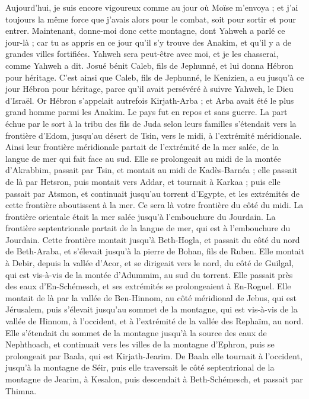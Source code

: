 \begin{multicols}{2}
Aujourd’hui, je suis encore vigoureux comme au jour où Moïse m’envoya ; et j’ai toujours la même force que j’avais alors pour le combat, soit pour sortir et pour entrer.
Maintenant, donne-moi donc cette montagne, dont Yahweh a parlé ce jour-là ; car tu as appris en ce jour qu’il s’y trouve des Anakim, et qu’il y a de grandes villes fortifiées. Yahweh sera peut-être avec moi, et je les chasserai, comme Yahweh a dit.
Josué bénit Caleb, fils de Jephunné, et lui donna Hébron pour héritage.
C’est ainsi que Caleb, fils de Jephunné, le Kenizien, a eu jusqu’à ce jour Hébron pour héritage, parce qu’il avait persévéré à suivre Yahweh, le Dieu d’Israël.
Or Hébron s’appelait autrefois Kirjath-Arba ; et Arba avait été le plus grand homme parmi les Anakim. Le pays fut en repos et sans guerre.
\VerseOne{}La part échue par le sort à la tribu des fils de Juda selon leurs familles s’étendait vers la frontière d’Edom, jusqu’au désert de Tsin, vers le midi, à l’extrémité méridionale.
Ainsi leur frontière méridionale partait de l’extrémité de la mer salée, de la langue de mer qui fait face au sud.
Elle se prolongeait au midi de la montée d’Akrabbim, passait par Tsin, et montait au midi de Kadès-Barnéa ; elle passait de là par Hetsron, puis montait vers Addar, et tournait à Karkaa ;
puis elle passait par Atsmon, et continuait jusqu’au torrent d’Egypte, et les extrémités de cette frontière aboutissent à la mer. Ce sera là votre frontière du côté du midi.
La frontière orientale était la mer salée jusqu’à l’embouchure du Jourdain. La frontière septentrionale partait de la langue de mer, qui est à l’embouchure du Jourdain.
Cette frontière montait jusqu’à Beth-Hogla, et passait du côté du nord de Beth-Araba, et s’élevait jusqu’à la pierre de Bohan, fils de Ruben.
Elle montait à Debir, depuis la vallée d’Acor, et se dirigeait vers le nord, du côté de Guilgal, qui est vis-à-vis de la montée d’Adummim, au sud du torrent. Elle passait près des eaux d’En-Schémesch, et ses extrémités se prolongeaient à En-Roguel.
Elle montait de là par la vallée de Ben-Hinnom, au côté méridional de Jebus, qui est Jérusalem, puis s’élevait jusqu’au sommet de la montagne, qui est vis-à-vis de la vallée de Hinnom, à l’occident, et à l’extrémité de la vallée des Rephaïm, au nord.
Elle s’étendait du sommet de la montagne jusqu’à la source des eaux de Nephthoach, et continuait vers les villes de la montagne d’Ephron, puis se prolongeait par Baala, qui est Kirjath-Jearim.
De Baala elle tournait à l’occident, jusqu’à la montagne de Séir, puis elle traversait le côté septentrional de la montagne de Jearim, à Kesalon, puis descendait à Beth-Schémesch, et passait par Thimna.

\end{multicols}
